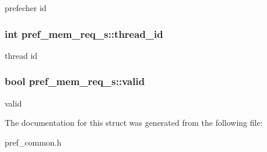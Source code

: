 \label{structpref__mem__req__s_a56208adb8dd71d2a86279e86994622cd}
prefecher id \hypertarget{structpref__mem__req__s_aab6cdec9cc8bb0c7df38876c9680d01a}{
\subsubsection[{thread\_\-id}]{\setlength{\rightskip}{0pt plus 5cm}int {\bf pref\_\-mem\_\-req\_\-s::thread\_\-id}}}
\label{structpref__mem__req__s_aab6cdec9cc8bb0c7df38876c9680d01a}
thread id \hypertarget{structpref__mem__req__s_a53ee77671e3af46272c4207f8bcce143}{
\subsubsection[{valid}]{\setlength{\rightskip}{0pt plus 5cm}bool {\bf pref\_\-mem\_\-req\_\-s::valid}}}
\label{structpref__mem__req__s_a53ee77671e3af46272c4207f8bcce143}
valid 

The documentation for this struct was generated from the following file:\begin{DoxyCompactItemize}
\item 
pref\_\-common.h\end{DoxyCompactItemize}
